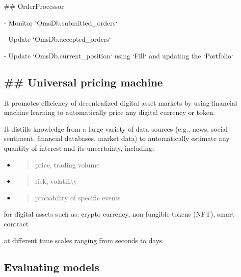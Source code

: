 \documentclass[11pt, reqno]{amsart}
\begin{document}
\#\# OrderProcessor

- Monitor `OmsDb.submitted\_orders`

- Update `OmsDb.accepted\_orders`

- Update `OmsDb.current\_position` using `Fill` and updating the
`Portfolio`

\hypertarget{section}{%
\subsection{}\label{section}}

\hypertarget{section-1}{%
\subsection{}\label{section-1}}

\hypertarget{universal-pricing-machine}{%
\subsection{\#\# Universal pricing
machine}\label{universal-pricing-machine}}

It promotes efficiency of decentralized digital asset markets by using
financial machine learning to automatically price any digital currency
or token.

It distills knowledge from a large variety of data sources (e.g., news,
social sentiment, financial databases, market data) to automatically
estimate any quantity of interest and its uncertainty, including:

\begin{itemize}
\item
  \begin{quote}
  price, trading volume
  \end{quote}
\item
  \begin{quote}
  risk, volatility
  \end{quote}
\item
  \begin{quote}
  probability of specific events
  \end{quote}
\end{itemize}

for digital assets such as: crypto currency, non-fungible tokens (NFT),
smart contract

at different time scales ranging from seconds to days.

\hypertarget{evaluating-models}{%
\subsection{Evaluating models}\label{evaluating-models}}
\end{document}
